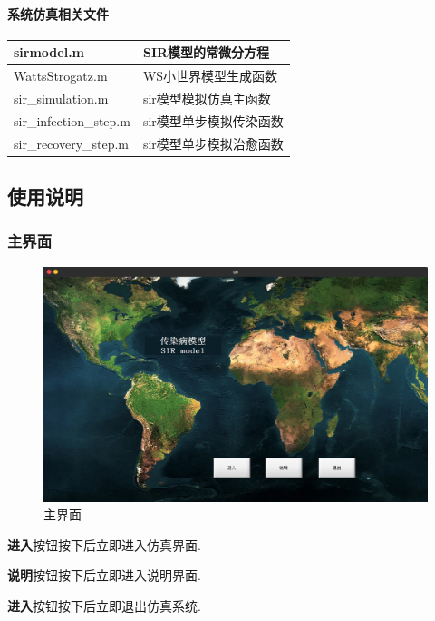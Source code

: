 \documentclass[supercite]{HustGraduPaper}
\begin{document}
	\paragraph{系统仿真相关文件}
	\begin{center}
		\begin{tabular}{|m{13em}|m{13em}|}
		\hline
		sirmodel.m & SIR模型的常微分方程 \\
		\hline
		WattsStrogatz.m & WS小世界模型生成函数 \\
		\hline
		sir\_simulation.m & sir模型模拟仿真主函数 \\
		\hline
		sir\_infection\_step.m & sir模型单步模拟传染函数 \\
		\hline
		sir\_recovery\_step.m  & sir模型单步模拟治愈函数 \\
		\hline
		\end{tabular}
	\end{center}

	\subsection{使用说明}
	\subsubsection{主界面}
	\begin{figure}[H]
		\centering
		\includegraphics[scale=0.3]{Figures/UI.png}
		\caption{主界面}
	\end{figure} 
	\textbf{进入}按钮按下后立即进入仿真界面.

	\textbf{说明}按钮按下后立即进入说明界面.

	\textbf{进入}按钮按下后立即退出仿真系统.
\end{document}
